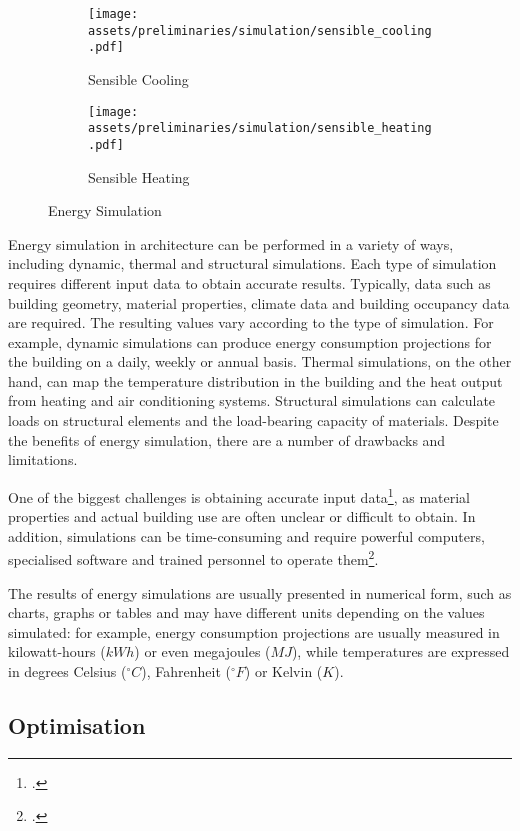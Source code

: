 \documentclass[a4paper, 12pt]{report}
\begin{document}
\begin{figure}
\centering
\begin{subfigure}{.5\textwidth}
\centering
\texttt{[image: assets/preliminaries/simulation/sensible\_cooling.pdf]}
\caption{Sensible Cooling}
\label{fig:sensible-cooling}
\end{subfigure}%
\begin{subfigure}{.5\textwidth}
\centering
\texttt{[image: assets/preliminaries/simulation/sensible\_heating.pdf]}
\caption{Sensible Heating}
\label{fig:sensible-heating}
\end{subfigure}
\caption{Energy Simulation}
\label{fig:energy-simulation}
\end{figure}

Energy simulation in architecture can be performed in a variety of ways, including dynamic, thermal and structural simulations. Each type of simulation requires different input data to obtain accurate results. Typically, data such as building geometry, material properties, climate data and building occupancy data are required. The resulting values vary according to the type of simulation. For example, dynamic simulations can produce energy consumption projections for the building on a daily, weekly or annual basis. Thermal simulations, on the other hand, can map the temperature distribution in the building and the heat output from heating and air conditioning systems. Structural simulations can calculate loads on structural elements and the load-bearing capacity of materials. Despite the benefits of energy simulation, there are a number of drawbacks and limitations.

One of the biggest challenges is obtaining accurate input data\footcite{hauck2017energy}, as material properties and actual building use are often unclear or difficult to obtain. In addition, simulations can be time-consuming and require powerful computers, specialised software and trained personnel to operate them\footcite{chatzivasileiadi2018effect}.

The results of energy simulations are usually presented in numerical form, such as charts, graphs or tables and may have different units depending on the values simulated: for example, energy consumption projections are usually measured in kilowatt-hours ($kWh$) or even megajoules ($MJ$), while temperatures are expressed in degrees Celsius ($^{\circ}C$), Fahrenheit ($^{\circ}F$) or Kelvin ($K$).

\subsection{Optimisation}\label{subsec:optimisation}
\end{document}
